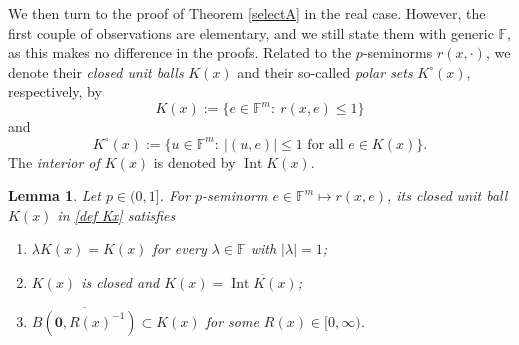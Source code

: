 \documentclass[11pt, reqno]{amsart}
\newtheorem{lemma}[theorem]{Lemma}
\theoremstyle{definition}
\theoremstyle{remark}
\numberwithin{equation}{section}
\newcommand{\F}{\mathbb F}
\newcommand{\abs}[1]{|#1|}
\begin{document}
We then turn to the proof of Theorem \ref{selectA} in the real case. However, the first couple of observations are elementary,
and we still state them with generic $\F$, as this makes no difference in the proofs.
Related to the $p$-seminorms $r(x,\cdot)$, we denote their \emph{closed unit balls} $K(x)$ and their so-called \emph{polar sets}
$K^\circ(x)$, respectively, by
\begin{equation}\label{def Kx}
K(x):=\{e\in\F^m:\ r(x,e)\leq 1\}
\end{equation}
and
\begin{equation}\label{def polar}
K^\circ(x):=\{u\in\F^m:\ \abs{(u,e)}\leq 1\text{ for all }e\in K(x)\}.
\end{equation}
The \emph{interior of $K(x)$} is denoted by $\operatorname{Int}K(x)$.

\begin{lemma}\label{Kx}
Let $p\in(0,1]$.
For $p$-seminorm $e\in\F^m\mapsto r(x,e)$, its closed unit ball
$K(x)$ in \eqref{def Kx} satisfies
\begin{enumerate}[\rm(i)]
\item\label{sym} $\lambda K(x)=K(x)$ for every $\lambda\in\F$ with $\abs{\lambda}=1$;

\item\label{cloInt} $K(x)$ is closed
and $K(x)=\overline{\operatorname{Int}K(x)}$;

\item\label{contBall} $\overline{B(\mathbf{0},R(x)^{-1})}\subset K(x)$
for some $R(x)\in[0,\infty)$.
\end{enumerate}
\end{lemma}
\end{document}
